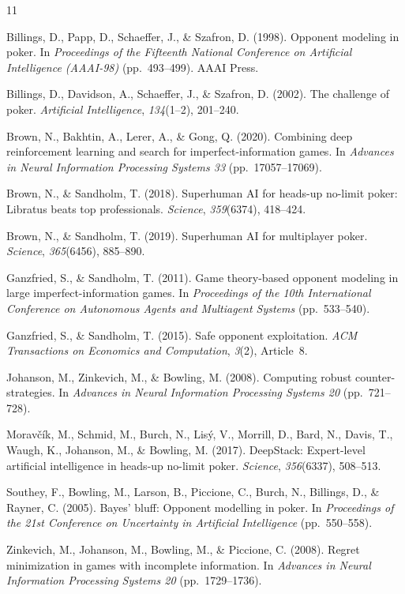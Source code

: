 \begin{thebibliography}{11}
\setlength{\itemsep}{0pt}

Billings, D., Papp, D., Schaeffer, J., \& Szafron, D. (1998). Opponent modeling in poker. In
\emph{Proceedings of the Fifteenth National Conference on Artificial Intelligence (AAAI-98)}
(pp.~493--499). AAAI Press.

Billings, D., Davidson, A., Schaeffer, J., \& Szafron, D. (2002). The challenge of poker.
\emph{Artificial Intelligence}, \emph{134}(1--2), 201--240.

Brown, N., Bakhtin, A., Lerer, A., \& Gong, Q. (2020). Combining deep reinforcement learning
and search for imperfect-information games. In \emph{Advances in Neural Information
Processing Systems 33} (pp.~17057--17069).

Brown, N., \& Sandholm, T. (2018). Superhuman AI for heads-up no-limit poker: Libratus beats
top professionals. \emph{Science}, \emph{359}(6374), 418--424.

Brown, N., \& Sandholm, T. (2019). Superhuman AI for multiplayer poker. \emph{Science},
\emph{365}(6456), 885--890.

Ganzfried, S., \& Sandholm, T. (2011). Game theory-based opponent modeling in large
imperfect-information games. In \emph{Proceedings of the 10th International Conference on
Autonomous Agents and Multiagent Systems} (pp.~533--540).

Ganzfried, S., \& Sandholm, T. (2015). Safe opponent exploitation. \emph{ACM Transactions on
Economics and Computation}, \emph{3}(2), Article~8.

Johanson, M., Zinkevich, M., \& Bowling, M. (2008). Computing robust counter-strategies. In
\emph{Advances in Neural Information Processing Systems 20} (pp.~721--728).

Morav\v{c}\'{i}k, M., Schmid, M., Burch, N., Lis\'{y}, V., Morrill, D., Bard, N., Davis, T.,
Waugh, K., Johanson, M., \& Bowling, M. (2017). DeepStack: Expert-level artificial
intelligence in heads-up no-limit poker. \emph{Science}, \emph{356}(6337), 508--513.

Southey, F., Bowling, M., Larson, B., Piccione, C., Burch, N., Billings, D., \& Rayner, C.
(2005). Bayes' bluff: Opponent modelling in poker. In \emph{Proceedings of the 21st
Conference on Uncertainty in Artificial Intelligence} (pp.~550--558).

Zinkevich, M., Johanson, M., Bowling, M., \& Piccione, C. (2008). Regret minimization in
games with incomplete information. In \emph{Advances in Neural Information Processing
Systems 20} (pp.~1729--1736).

\end{thebibliography}
